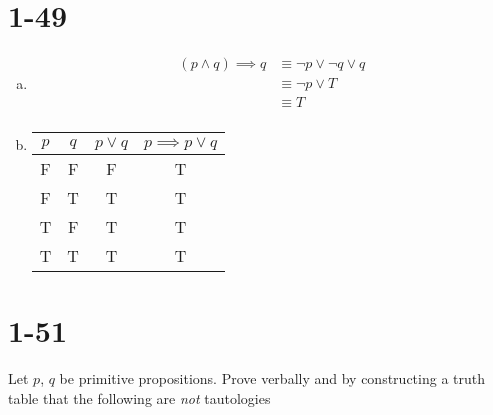 \documentclass{article}
\begin{document}
\section{1-49}

\begin{enumerate}[a)]
    \item
        \begin{align*}
            (p \land q) \implies q
            &\equiv \neg p \lor \neg q \lor q \\
            &\equiv \neg p \lor T \\
            &\equiv T \\
        \end{align*}
    \item
        \begin{tabular}{ |c|c|c|c| }
            \hline
                $p$ & $q$ & $p \lor q$ & $p \implies p \lor q$ \\
            \hline
                F & F & F & T \\
                F & T & T & T \\
                T & F & T & T \\
                T & T & T & T \\
            \hline
        \end{tabular}
\end{enumerate}

\section{1-51}

Let $p$, $q$ be primitive propositions.  Prove verbally and by
constructing a truth table that the following are \textit{not}
tautologies
\end{document}
